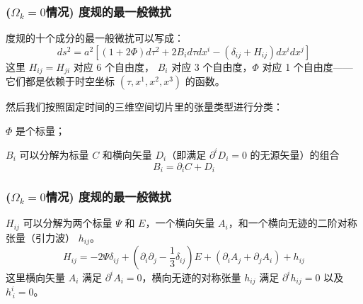\documentclass[CJK,13pt]{beamer}
\begin{document}
   \begin{frame}
      \frametitle{($\Omega_k=0$情况) 度规的最一般微扰}
      度规的十个成分的最一般微扰可以写成：
      $$ ds^2 = a^2\left[(1+2\Phi)d\tau^2+ 2B_id\tau dx^i - \left(\delta_{ij}+H_{ij}\right)dx^i dx^j\right]$$
      这里 $H_{ij}=H_{ji}$ 对应 6 个自由度， $B_i$ 对应 3 个自由度，$\Phi$ 对应 1 个自由度——它们都是依赖于时空坐标 $(\tau, x^1,x^2,x^3)$ 的函数。

      \skipline

      然后我们{\blue 按照固定时间的三维空间切片里的张量类型}进行分类：
      \bitem
      \item{$\Phi$ 是个标量；}

        \item{$B_i$ 可以分解为标量 $C$ 和横向矢量 $D_i$（即满足 $\partial^iD_i=0$ 的无源矢量）的组合
          $$ B_i = \partial_i C +  D_i$$}
          \eitem

      
  \end{frame}

   \begin{frame}
      \frametitle{($\Omega_k=0$情况) 度规的最一般微扰}
      \bitem
    \item{$H_{ij}$ 可以分解为两个标量 $\Psi$ 和 $E$，一个横向矢量 $A_i$，和一个横向无迹的二阶对称张量（引力波） $h_{ij}$。
      $$ H_{ij} = -2\Psi \delta_{ij} + \left(\partial_i\partial_j - \frac{1}{3}\delta_{ij}\right)E + (\partial_iA_j + \partial_j A_i) + h_{ij}$$
      这里横向矢量  $A_i$ 满足 $\partial^iA_i=0$，横向无迹的对称张量 $h_{ij}$ 满足 $\partial^ih_{ij} = 0$ 以及 $h^i_{\, i} = 0$。


      \skiplines


    }
      \eitem
  \end{frame}
   
\end{document}
